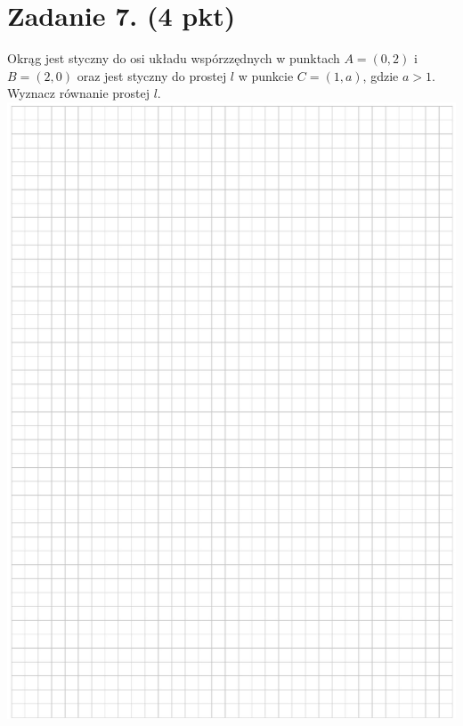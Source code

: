 \documentclass[10pt]{article}
\begin{document}
\section*{Zadanie 7. (4 pkt)}
Okrąg jest styczny do osi układu wspórzzędnych w punktach \(A=(0,2)\) i \(B=(2,0)\) oraz jest styczny do prostej \(l\) w punkcie \(C=(1, a)\), gdzie \(a>1\). Wyznacz równanie prostej \(l\).\\
\includegraphics[max width=\textwidth, center]{2024_11_21_d9af6ed2d610d3f2d2cbg-10}\\
\end{document}
